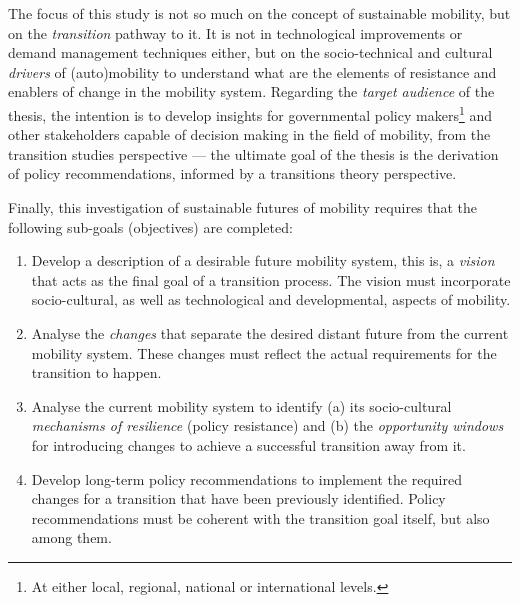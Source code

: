 The focus of this study is not so much on the concept of sustainable mobility, but on the \emph{transition} pathway to it. It is not in technological improvements or demand management techniques either, but on the socio-technical and cultural \emph{drivers} of (auto)mobility to understand what are the elements of resistance and enablers of change in the mobility system. Regarding the \emph{target audience} of the thesis, the intention is to develop insights for governmental policy makers\footnote{At either local, regional, national or international levels.} and other stakeholders capable of decision making in the field of mobility, from the transition studies perspective --- the ultimate goal of the thesis is the derivation of policy recommendations, informed by a transitions theory perspective.

Finally, this investigation of sustainable futures of mobility requires that the following sub-goals (objectives) are completed:
\begin{enumerate}[leftmargin=*,label=\textbf{Obj.~\arabic*.}]
\item Develop a description of a desirable future mobility system, this is, a \emph{vision} that acts as the final goal of a transition process. The vision must incorporate socio-cultural, as well as technological and developmental, aspects of mobility.
\item Analyse the \emph{changes} that separate the desired distant future from the current mobility system. These changes must reflect the actual requirements for the transition to happen.
\item Analyse the current mobility system to identify (a) its socio-cultural \emph{mechanisms of resilience} (policy resistance) and (b) the \emph{opportunity windows} for introducing changes to achieve a successful transition away from it.
\item Develop long-term policy recommendations to implement the required changes for a transition that have been previously identified. Policy recommendations must be coherent with the transition goal itself, but also among them.
\end{enumerate}